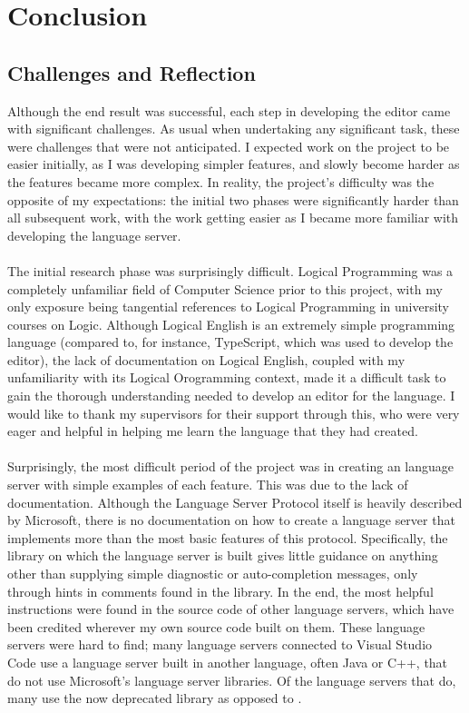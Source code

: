 \documentclass[../main.tex]{subfiles}
\begin{document}
\chapter{Conclusion} 
\section{Challenges and Reflection}
Although the end result was successful, each step in developing the editor came with significant challenges. As usual when undertaking any significant task, these were challenges that were not anticipated. I expected work on the project to be easier initially, as I was developing simpler features, and slowly become harder as the features became more complex. In reality, the project's difficulty was the opposite of my expectations: the initial two phases were significantly harder than all subsequent work, with the work getting easier as I became more familiar with developing the language server.
\\
\\
The initial research phase was surprisingly difficult. Logical Programming was a completely unfamiliar field of Computer Science prior to this project, with my only exposure being tangential references to Logical Programming in university courses on Logic. Although Logical English is an extremely simple programming language (compared to, for instance, TypeScript, which was used to develop the editor), the lack of documentation on Logical English, coupled with my unfamiliarity with its Logical Orogramming context, made it a difficult task to gain the thorough understanding needed to develop an editor for the language. I would like to thank my supervisors for their support through this, who were very eager and helpful in helping me learn the language that they had created. 
\\
\\
Surprisingly, the most difficult period of the project was in creating an language server with simple examples of each feature. This was due to the lack of documentation. Although the Language Server Protocol itself is heavily described by Microsoft, there is no documentation on how to create a language server that implements more than the most basic features of this protocol. Specifically, the  library on which the language server is built gives little guidance on anything other than supplying simple diagnostic or auto-completion messages, only through hints in comments found in the library. In the end, the most helpful instructions were found in the source code of other language servers, which have been credited wherever my own source code built on them. These language servers were hard to find; many language servers connected to Visual Studio Code use a language server built in another language, often Java or C++, that do not use Microsoft's language server libraries. Of the language servers that do, many use the now deprecated  library as opposed to .
\end{document}
